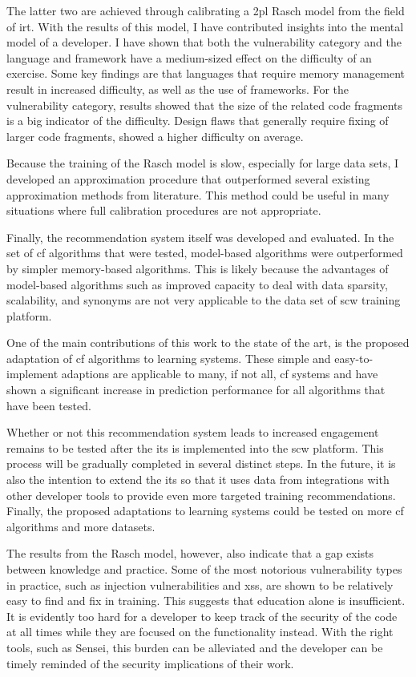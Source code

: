 The latter two are achieved through calibrating a \gls{2pl} Rasch model from the field of \gls{irt}.
With the results of this model, I have contributed insights into the mental model of a developer.
I have shown that both the vulnerability category and the language and framework have a medium-sized effect on the difficulty of an exercise.
Some key findings are that languages that require memory management result in increased difficulty, as well as the use of frameworks.
For the vulnerability category, results showed that the size of the related code fragments is a big indicator of the difficulty.
Design flaws that generally require fixing of larger code fragments, showed a higher difficulty on average.

Because the training of the Rasch model is slow, especially for large data sets, I developed an approximation procedure that outperformed several existing approximation methods from literature.
This method could be useful in many situations where full calibration procedures are not appropriate.

Finally, the recommendation system itself was developed and evaluated.
In the set of \gls{cf} algorithms that were tested, model-based algorithms were outperformed by simpler memory-based algorithms.
This is likely because the advantages of model-based algorithms such as improved capacity to deal with data sparsity, scalability, and synonyms are not very applicable to the data set of \gls{scw} training platform.

One of the main contributions of this work to the state of the art, is the proposed adaptation of \gls{cf} algorithms to learning systems.
These simple and easy-to-implement adaptions are applicable to many, if not all, \gls{cf} systems and have shown a significant increase in prediction performance for all algorithms that have been tested.

Whether or not this recommendation system leads to increased engagement remains to be tested after the \gls{its} is implemented into the \gls{scw} platform.
This process will be gradually completed in several distinct steps.
In the future, it is also the intention to extend the \gls{its} so that it uses data from integrations with other developer tools to provide even more targeted training recommendations.
Finally, the proposed adaptations to learning systems could be tested on more \gls{cf} algorithms and more datasets. 

The results from the Rasch model, however, also indicate that a gap exists between knowledge and practice.
Some of the most notorious vulnerability types in practice, such as injection vulnerabilities and \gls{xss}, are shown to be relatively easy to find and fix in training.
This suggests that education alone is insufficient.
It is evidently too hard for a developer to keep track of the security of the code at all times while they are focused on the functionality instead.
With the right tools, such as Sensei, this burden can be alleviated and the developer can be timely reminded of the security implications of their work.

